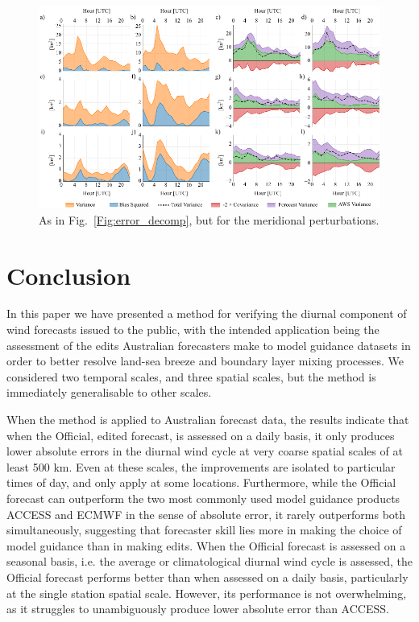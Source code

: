\documentclass{ametsoc}
\begin{document}
\begin{figure}
\centering
\includegraphics[width=39pc]{error_decomp_v.pdf}
\caption{As in Fig.~\ref{Fig:error_decomp}, but for the meridional perturbations.}
\label{Fig:error_decomp_v}
\end{figure}

\section{Conclusion}
\label{Sec:Conclusion}
In this paper we have presented a method for verifying the diurnal component of wind forecasts issued to the public, with the intended application being the assessment of the edits Australian forecasters make to model guidance datasets in order to better resolve land-sea breeze and boundary layer mixing processes. We considered two temporal scales, and three spatial scales, but the method is immediately generalisable to other scales. 

When the method is applied to Australian forecast data, the results indicate that when the Official, edited forecast, is assessed on a daily basis, it only produces lower absolute errors in the diurnal wind cycle at very coarse spatial scales of at least 500 km. Even at these scales, the improvements are isolated to particular times of day, and only apply at some locations. Furthermore, while the Official forecast can outperform the two most commonly used model guidance products ACCESS and ECMWF in the sense of absolute error, it rarely outperforms both simultaneously, suggesting that forecaster skill lies more in making the choice of model guidance than in making edits. When the Official forecast is assessed on a seasonal basis, i.e. the average or climatological diurnal wind cycle is assessed, the Official forecast performs better than when assessed on a daily basis, particularly at the single station spatial scale. However, its performance is not overwhelming, as it struggles to unambiguously produce lower absolute error than ACCESS. 
\end{document}
